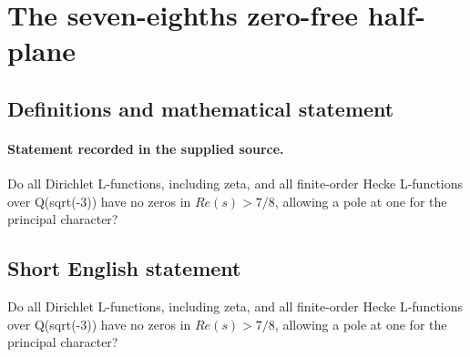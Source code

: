 \documentclass[11pt]{article}
\begin{document}
\section*{The seven-eighths zero-free half-plane}\label{30007279}
\subsection{Definitions and mathematical statement}
\paragraph{Statement recorded in the supplied source.}
Do all Dirichlet L-functions, including zeta, and all finite-order Hecke L-functions over Q(sqrt(-3)) have no zeros in $Re(s)>7/8$, allowing a pole at one for the principal character?
\subsection{Short English statement}
Do all Dirichlet L-functions, including zeta, and all finite-order Hecke L-functions over Q(sqrt(-3)) have no zeros in $Re(s)>7/8$, allowing a pole at one for the principal character?
\end{document}
